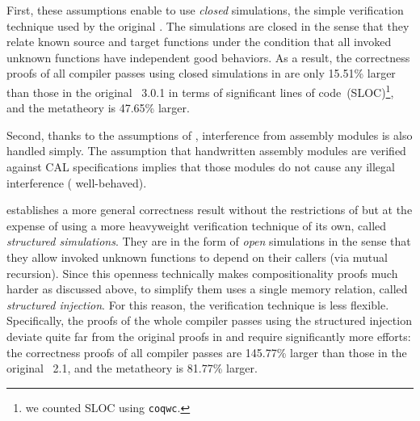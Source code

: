 First, these assumptions enable \ccx{} to use \emph{closed}
simulations, the simple verification technique used by the original
\cc{}. The simulations are closed in the sense that they relate known
source and target functions under the condition that all invoked
unknown functions have independent good behaviors.
As a result, the correctness proofs of
all compiler passes using closed simulations in \ccx{} are only 15.51\% larger than
those in the original \cc{}~3.0.1 in terms of significant lines of code~(SLOC)\footnote{we counted SLOC using \texttt{coqwc}.},
and the metatheory  is 47.65\% larger.

Second, thanks to the assumptions of \ccx{}, interference from
assembly modules is also handled simply.  The assumption that
handwritten assembly modules are verified against CAL specifications
implies that those modules do not cause any illegal interference (\ie
well-behaved).

%
\ccc{} establishes a more general correctness result \mbox{without}
the restrictions of \ccx{} but at the expense of using a more
heavyweight verification technique of its own, called \emph{structured
  simulations}. They are in the form of \emph{open} simulations in the
sense that they allow invoked unknown functions to depend on their
callers (\eg via mutual recursion). Since this openness technically
makes compositionality proofs much harder as discussed above, to simplify them \ccc{}
uses a single memory relation, called \emph{structured injection}.
For this reason, the verification technique is less flexible.
Specifically, the proofs of the whole compiler passes using the
structured injection deviate quite far from the original proofs in
\cc{} and require significantly more efforts: the correctness proofs
of all compiler passes are 145.77\% larger than those in the
original \cc{}~2.1, and the metatheory is 81.77\% larger.

